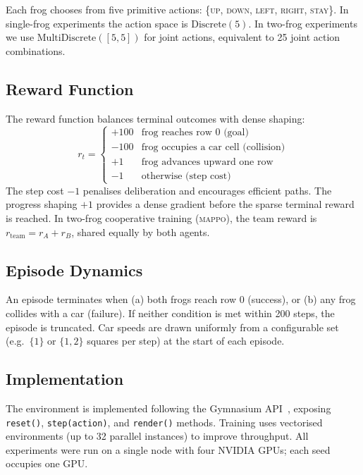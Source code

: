 \documentclass[12pt]{article}
\newcommand{\MAPPO}{\textsc{mappo}}
\begin{document}
Each frog chooses from five primitive actions: \{\textsc{up}, \textsc{down},
\textsc{left}, \textsc{right}, \textsc{stay}\}.  In single-frog experiments
the action space is $\text{Discrete}(5)$.  In two-frog experiments we use
$\text{MultiDiscrete}([5, 5])$ for joint actions, equivalent to 25 joint
action combinations.

\subsection{Reward Function}

The reward function balances terminal outcomes with dense shaping:
\begin{equation}
  r_t =
  \begin{cases}
    +100 & \text{frog reaches row 0 (goal)} \\
    -100 & \text{frog occupies a car cell (collision)} \\
    +1   & \text{frog advances upward one row} \\
    -1   & \text{otherwise (step cost)}
  \end{cases}
  \label{eq:reward}
\end{equation}
The step cost $-1$ penalises deliberation and encourages efficient paths.
The progress shaping $+1$ provides a dense gradient before the sparse terminal
reward is reached.  In two-frog cooperative training (\MAPPO), the team reward
is $r_{\text{team}} = r_A + r_B$, shared equally by both agents.

\subsection{Episode Dynamics}

An episode terminates when (a) both frogs reach row 0 (success), or (b) any
frog collides with a car (failure).  If neither condition is met within 200
steps, the episode is truncated.  Car speeds are drawn uniformly from a
configurable set (e.g.\ $\{1\}$ or $\{1, 2\}$ squares per step) at the start
of each episode.

\subsection{Implementation}

The environment is implemented following the Gymnasium
API~\citep{towers2023gymnasium}, exposing \texttt{reset()},
\texttt{step(action)}, and \texttt{render()} methods.  Training uses vectorised
environments (up to 32 parallel instances) to improve throughput.  All
experiments were run on a single node with four NVIDIA GPUs; each seed occupies
one GPU.
\end{document}
